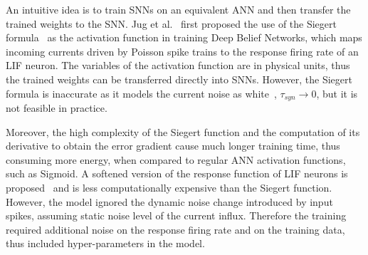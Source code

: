 \documentclass{article}
\begin{document}
	An intuitive idea is to train SNNs on an equivalent ANN and then transfer the trained weights to the SNN.
	Jug et al.~\cite{Jug_etal_2012} first proposed the use of the Siegert formula~\cite{siegert1951first} as the activation function in training Deep Belief Networks, which maps incoming currents driven by Poisson spike trains to the response firing rate of an LIF neuron.
	The variables of the activation function are in physical units, thus the trained weights can be transferred directly into SNNs.
	However, the Siegert formula is inaccurate as it models the current noise as white~\cite{liu2016noisy}, $\tau_{syn} \to 0$, but it is not feasible in practice.

	Moreover, the high complexity of the Siegert function and the computation of its derivative to obtain the error gradient cause much longer training time, thus consuming more energy, when compared to regular ANN activation functions, such as Sigmoid.
	A softened version of the response function of LIF neurons is proposed~\cite{hunsberger2015spiking} and is less computationally expensive than the Siegert function.
	However, the model ignored the dynamic noise change introduced by input spikes, assuming static noise level of the current influx.
	Therefore the training required additional noise on the response firing rate and on the training data, thus included hyper-parameters in the model.
	
\end{document}
